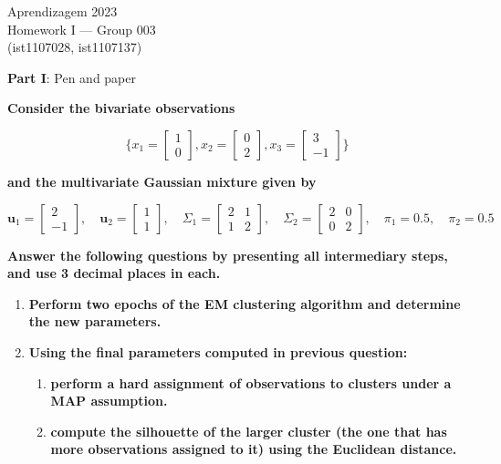 \documentclass[12pt]{article}
\begin{document}
\begin{center}
Aprendizagem 2023\\
Homework I --- Group 003\\
(ist1107028, ist1107137)\vskip 1cm
\end{center}

\large{\textbf{Part I}: Pen and paper}\normalsize

\vspace{20pt}
\textbf{Consider the bivariate observations}

\begin{equation*}\{
    x_1 = \begin{bmatrix}
        1 \\
        0
    \end{bmatrix},
    x_2 = \begin{bmatrix}
        0 \\
        2
    \end{bmatrix},
    x_3 = \begin{bmatrix}
        3 \\
        -1
    \end{bmatrix}\}
\end{equation*}

\vspace{10pt}
\textbf{and the multivariate Gaussian mixture given by}

\[
\mathbf{u}_1 = \begin{bmatrix} 2 \\ -1 \end{bmatrix}, \quad
\mathbf{u}_2 = \begin{bmatrix} 1 \\ 1 \end{bmatrix}, \quad
\Sigma_1 = \begin{bmatrix} 2 & 1 \\ 1 & 2 \end{bmatrix}, \quad
\Sigma_2 = \begin{bmatrix} 2 & 0 \\ 0 & 2 \end{bmatrix}, \quad
\pi_1 = 0.5, \quad \pi_2 = 0.5
\]

\vspace{10pt}
\textbf{Answer the following questions by presenting all intermediary steps, and use 3 decimal places in
each.}

\begin{enumerate}
    \item \textbf{Perform two epochs of the EM clustering algorithm and determine the new parameters.}
    \item \textbf{Using the ﬁnal parameters computed in previous question:}
    \begin{enumerate}[label=\alph*)]
        \item \textbf{perform a hard assignment of observations to clusters under a MAP assumption.}
        \item \textbf{compute the silhouette of the larger cluster (the one that has more observations
        assigned to it) using the Euclidean distance.}
    \end{enumerate}
\end{enumerate}
\end{document}
